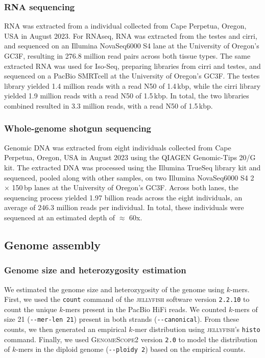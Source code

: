 \subsubsection*{RNA sequencing}

RNA was extracted from a \bgla{} individual collected from Cape
Perpetua, Oregon, USA in August 2023. For RNAseq, RNA was extracted from the
testes and cirri, and sequenced on an Illumina NovaSeq6000 S4 lane at the University
of Oregon's GC3F, resulting in 276.8 million read pairs across both tissue types.
The same extracted RNA was used for Iso-Seq, preparing libraries from cirri and testes,
and sequenced on a PacBio SMRTcell at the University of Oregon's GC3F. The
testes library yielded 1.4 million reads with a read N50 of 1.4\,kbp, while the
cirri library yielded 1.9 million reads with a read N50 of 1.5\,kbp. In total,
the two libraries combined resulted in 3.3 million reads, with a read N50 of
1.5\,kbp.

\subsubsection*{Whole-genome shotgun sequencing}

Genomic DNA was extracted from eight \bgla{} individuals collected
from Cape Perpetua, Oregon, USA in August 2023 using the QIAGEN Genomic-Tips
20/G kit. The extracted DNA was processed using the Illumina TrueSeq library
kit and sequenced, pooled along with other samples, on two Illumina NovaSeq6000
S4 2 $\times$ 150\,bp lanes at the University of Oregon's GC3F. Across both lanes,
the sequencing process yielded 1.97 billion reads across the eight individuals,
an average of 246.3 million reads per individual. In total, these individuals
were sequenced at an estimated depth of $\approx$ 60x.

\subsection*{Genome assembly}\label{sec:methods_assembly}

\subsubsection*{Genome size and heterozygosity estimation}

We estimated the genome size and heterozygosity of the \bgla{}
genome using $k$-mers. First, we used the \texttt{count} command of the
\textsc{jellyfish} software version \texttt{2.2.10} \citep{marcais_fast_2011}
to count the unique $k$-mers present in the PacBio HiFi reads. We counted $k$-mers
of size 21 (\texttt{-{}-mer-len 21}) present in both strands (\texttt{-{}-canonical}).
From these counts, we then generated an empirical $k$-mer distribution using
\textsc{jellyfish}'s \texttt{histo} command. Finally, we used
\textsc{GenomeScope2} version \texttt{2.0} \citep{ranallo-benavidez_genomescope_2020}
to model the distribution of $k$-mers in the diploid genome (\texttt{-{}-ploidy 2})
based on the empirical counts.

